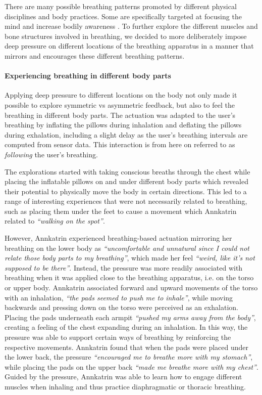 There are many possible breathing patterns promoted by different physical disciplines and body practices. Some are specifically targeted at focusing the mind and increase bodily awareness \cite{kupershmidt_definition_2019, burke_role_2008}. To further explore the different muscles and bone structures involved in breathing, we decided to more deliberately impose deep pressure on different locations of the breathing apparatus in a manner that mirrors and encourages these different breathing patterns.

\paragraph{Experiencing breathing in different body parts}
Applying deep pressure to different locations on the body not only made it possible to explore symmetric vs asymmetric feedback, but also to feel the breathing in different body parts. The actuation was adapted to the user's breathing by inflating the pillows during inhalation and deflating the pillows during exhalation, including a slight delay as the user’s breathing intervals are computed from sensor data. This interaction is from here on referred to as \textit{following} the user's breathing.

The explorations started with taking conscious breaths through the chest while placing the inflatable pillows on and under different body parts which revealed their potential to physically move the body in certain directions. This led to a range of interesting experiences that were not necessarily related to breathing, such as placing them under the feet to cause a movement which Annkatrin related to \textit{``walking on the spot''}.

However, Annkatrin experienced breathing-based actuation mirroring her breathing on the lower body as \textit{``uncomfortable and unnatural since I could not relate those body parts to my breathing''}, which made her feel \textit{``weird, like it's not supposed to be there''}. Instead, the pressure was more readily associated with breathing when it was applied close to the breathing apparatus, i.e. on the torso or upper body. Annkatrin associated forward and upward movements of the torso with an inhalation, \textit{``the pads seemed to push me to inhale''}, while moving backwards and pressing down on the torso were perceived as an exhalation. Placing the pads underneath each armpit \textit{``pushed my arms away from the body''}, creating a feeling of the chest expanding during an inhalation. In this way, the pressure was able to support certain ways of breathing by reinforcing the respective movements. Annkatrin found that when the pads were placed under the lower back, the pressure \textit{``encouraged me to breathe more with my stomach''}, while placing the pads on the upper back \textit{``made me breathe more with my chest''}. Guided by the pressure, Annkatrin was able to learn how to engage different muscles when inhaling and thus practice diaphragmatic or thoracic breathing.

